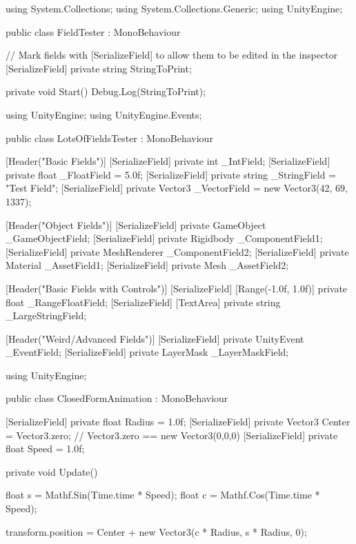\documentclass[11pt]{article}
\def\StartLineAt#1{\lstset{firstnumber=#1}}
\begin{document}
\StartLineAt{1}
\begin{csharp}
using System.Collections;
using System.Collections.Generic;
using UnityEngine;

public class FieldTester : MonoBehaviour
{
    // Mark fields with [SerializeField] to allow them to be edited in the inspector
    [SerializeField]
    private string StringToPrint;

    private void Start()
    {
        Debug.Log(StringToPrint);
    }
}
\end{csharp}

\pagebreak

\StartLineAt{1}
\begin{csharp}
using UnityEngine;
using UnityEngine.Events;

public class LotsOfFieldsTester : MonoBehaviour
{
    [Header("Basic Fields")]
    [SerializeField]
    private int _IntField;
    [SerializeField]
    private float _FloatField = 5.0f;
    [SerializeField]
    private string _StringField = "Test Field";
    [SerializeField]
    private Vector3 _VectorField = new Vector3(42, 69, 1337);

    [Header("Object Fields")]
    [SerializeField]
    private GameObject _GameObjectField;
    [SerializeField]
    private Rigidbody _ComponentField1;
    [SerializeField]
    private MeshRenderer _ComponentField2;
    [SerializeField]
    private Material _AssetField1;
    [SerializeField]
    private Mesh _AssetField2;

    [Header("Basic Fields with Controls")]
    [SerializeField]
    [Range(-1.0f, 1.0f)]
    private float _RangeFloatField;
    [SerializeField]
    [TextArea]
    private string _LargeStringField;

    [Header("Weird/Advanced Fields")]
    [SerializeField]
    private UnityEvent _EventField;
    [SerializeField]
    private LayerMask _LayerMaskField;
}
\end{csharp}

\StartLineAt{1}
\begin{csharp}
using UnityEngine;

public class ClosedFormAnimation : MonoBehaviour
{
    [SerializeField]
    private float Radius = 1.0f;
    [SerializeField]
    private Vector3 Center = Vector3.zero; // Vector3.zero == new Vector3(0,0,0)
    [SerializeField]
    private float Speed = 1.0f;

    private void Update()
    {
        float s = Mathf.Sin(Time.time * Speed);
        float c = Mathf.Cos(Time.time * Speed);

        transform.position = Center + new Vector3(c * Radius, s * Radius, 0);
    }
}
\end{csharp}
\end{document}
